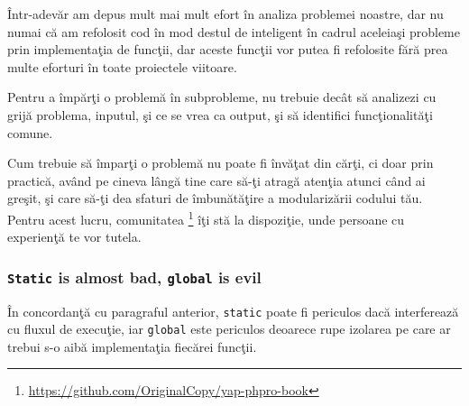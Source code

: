 Într-adevăr am depus mult mai mult efort în analiza problemei noastre, dar
nu numai că am refolosit cod în mod destul de inteligent în
cadrul aceleiaşi probleme prin implementaţia
de funcţii, dar aceste funcţii vor putea fi refolosite fără prea multe
eforturi în toate proiectele viitoare.

Pentru a împărţi o problemă în subprobleme, nu trebuie decât să analizezi
cu grijă problema, inputul, şi ce se vrea ca output, şi să identifici
funcţionalităţi comune.

Cum trebuie să împarţi o problemă nu poate fi învăţat din cărţi, ci doar
prin practică, având pe cineva lângă tine care să-ţi atragă atenţia
atunci când ai greşit, şi care să-ţi dea sfaturi de îmbunătăţire
a modularizării codului tău. Pentru acest lucru, comunitatea
{\phpro}\footnote{\url{https://github.com/OriginalCopy/yap-phpro-book}}
îţi stă la dispoziţie, unde persoane cu experienţă te vor tutela.


\subsubsection{\texttt{Static} is almost bad, \texttt{global} is evil}
În concordanţă cu paragraful anterior, \texttt{static} poate fi periculos
dacă interferează cu fluxul de execuţie, iar \texttt{global} este
periculos deoarece rupe izolarea pe care ar trebui s-o aibă implementaţia
fiecărei funcţii.

